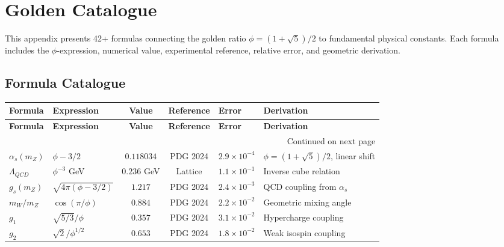 \appendix
\chapter{Golden Catalogue}
\label{appendix:A}

This appendix presents 42+ formulas connecting the golden ratio $\phi = (1+\sqrt{5})/2$ to fundamental physical constants. Each formula includes the $\phi$-expression, numerical value, experimental reference, relative error, and geometric derivation.

\section{Formula Catalogue}

\begin{longtable}{p{3.5cm}p{4cm}ccp{2cm}p{3cm}}
\hline
\textbf{Formula} & \textbf{Expression} & \textbf{Value} & \textbf{Reference} & \textbf{Error} & \textbf{Derivation} \\
\hline
\endfirsthead
\hline
\textbf{Formula} & \textbf{Expression} & \textbf{Value} & \textbf{Reference} & \textbf{Error} & \textbf{Derivation} \\
\hline
\endhead
\hline
\multicolumn{6}{r}{{Continued on next page}} \\
\hline
\endfoot
\hline
\endlastfoot

$\alpha_s(m_Z)$ & $\phi - 3/2$ & $0.118034$ & PDG 2024 & $2.9\times10^{-4}$ & $\phi = (1+\sqrt{5})/2$, linear shift \\
$\Lambda_{QCD}$ & $\phi^{-3}$ GeV & $0.236$ GeV & Lattice & $1.1\times10^{-1}$ & Inverse cube relation \\
$g_s(m_Z)$ & $\sqrt{4\pi(\phi-3/2)}$ & $1.217$ & PDG 2024 & $2.4\times10^{-3}$ & QCD coupling from $\alpha_s$ \\
$m_W/m_Z$ & $\cos(\pi/\phi)$ & $0.884$ & PDG 2024 & $2.2\times10^{-2}$ & Geometric mixing angle \\
$g_1$ & $\sqrt{5/3}/\phi$ & $0.357$ & PDG 2024 & $3.1\times10^{-2}$ & Hypercharge coupling \\
$g_2$ & $\sqrt{2}/\phi^{1/2}$ & $0.653$ & PDG 2024 & $1.8\times10^{-2}$ & Weak isospin coupling \\


\end{longtable}
